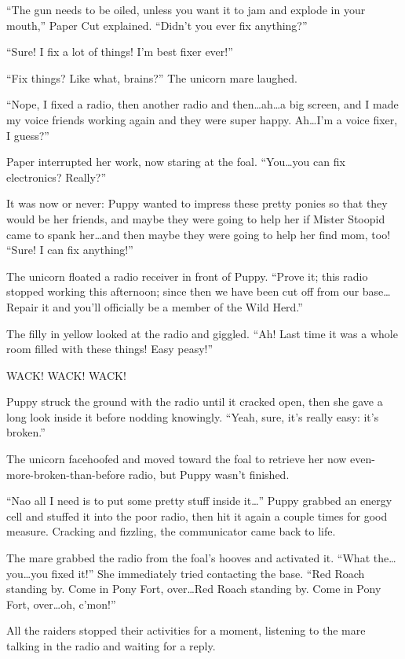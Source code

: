 ``The gun needs to be oiled, unless you want it to jam and explode in your mouth,'' Paper Cut explained. ``Didn't you ever fix anything?''

``Sure! I fix a lot of things! I'm best fixer ever!''

``Fix things? Like what, brains?'' The unicorn mare laughed.

``Nope, I fixed a radio, then another radio and then\dots ah\dots a big screen, and I made my voice friends working again and they were super happy. Ah\dots I'm a voice fixer, I guess?''

Paper interrupted her work, now staring at the foal. ``You\dots you can fix electronics? Really?''

It was now or never: Puppy wanted to impress these pretty ponies so that they would be her friends, and maybe they were going to help her if Mister Stoopid came to spank her\dots and then maybe they were going to help her find mom, too! ``Sure! I can fix anything!''

The unicorn floated a radio receiver in front of Puppy. ``Prove it; this radio stopped working this afternoon; since then we have been cut off from our base\dots Repair it and you'll officially be a member of the Wild Herd.''

The filly in yellow looked at the radio and giggled. ``Ah! Last time it was a whole room filled with these things! Easy peasy!''

WACK! WACK! WACK!

Puppy struck the ground with the radio until it cracked open, then she gave a long look inside it before nodding knowingly. ``Yeah, sure, it's really easy: it's broken.''

The unicorn facehoofed and moved toward the foal to retrieve her now even-more-broken-than-before radio, but Puppy wasn't finished.

``Nao all I need is to put some pretty stuff inside it\dots'' Puppy grabbed an energy cell and stuffed it into the poor radio, then hit it again a couple times for good measure. Cracking and fizzling, the communicator came back to life.

The mare grabbed the radio from the foal's hooves and activated it. ``What the\dots you\dots you fixed it!'' She immediately tried contacting the base. ``Red Roach standing by. Come in Pony Fort, over\dots Red Roach standing by. Come in Pony Fort, over\dots oh, c'mon!''

All the raiders stopped their activities for a moment, listening to the mare talking in the radio and waiting for a reply.

